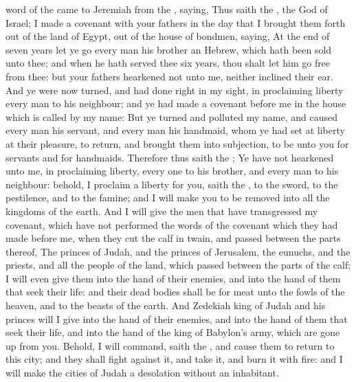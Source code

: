 {word of the
{} came to
Jeremiah from the
{},
saying,
Thus
saith the
{}, the
God of
Israel; I
made a
covenant with your
fathers in the
day that I brought them
forth out of the
land of
Egypt, out of the
house of
bondmen,
saying,
At the
end of
seven
years let ye
go every
man his
brother an
Hebrew, which hath been
sold unto thee; and when he hath
served thee
six
years, thou shalt let him
go
free from thee: but your
fathers
hearkened not unto me, neither
inclined their
ear.
And ye were
now
turned, and had
done
right in my
sight, in
proclaiming
liberty every
man to his
neighbour; and ye had
made a
covenant
before me in the
house which is
called by my
name:
But ye
turned and
polluted my
name, and caused every
man his
servant, and every
man his
handmaid, whom ye had
set at
liberty at their
pleasure, to
return, and brought them into
subjection, to be unto you for
servants and for
handmaids.
Therefore thus
saith the
{}; Ye have not
hearkened unto me, in
proclaiming
liberty, every
one to his
brother, and every
man to his
neighbour: behold, I
proclaim a
liberty for you,
saith the
{}, to the
sword, to the
pestilence, and to the
famine; and I will
make you to be
removed into all the
kingdoms of the
earth.
And I will
give the
men that have
transgressed my
covenant, which have not
performed the
words of the
covenant which they had
made
before me, when they
cut the
calf in
twain, and
passed between the
parts thereof,
The
princes of
Judah, and the
princes of
Jerusalem, the
eunuchs, and the
priests, and all the
people of the
land, which
passed between the
parts of the
calf;
I will even
give them into the
hand of their
enemies, and into the
hand of them that
seek their
life: and their dead
bodies shall be for
meat unto the
fowls of the
heaven, and to the
beasts of the
earth.
And
Zedekiah
king of
Judah and his
princes will I
give into the
hand of their
enemies, and into the
hand of them that
seek their
life, and into the
hand of the
king of
Babylon’s
army, which are gone
up from you.
Behold, I will
command,
saith the
{}, and cause them to
return to this
city; and they shall
fight against it, and
take it, and
burn it with
fire: and I will
make the
cities of
Judah a
desolation without an
inhabitant.

}
